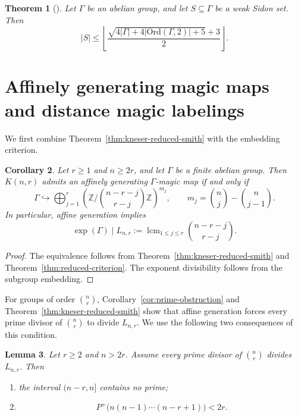 \documentclass[11pt,reqno]{amsart}
\theoremstyle{plain}
\newtheorem{theorem}{Theorem}[section]
\newtheorem{lemma}[theorem]{Lemma}
\newtheorem{corollary}[theorem]{Corollary}
\theoremstyle{definition}
\theoremstyle{remark}
\DeclareMathOperator{\ex}{exp}
\begin{document}
\begin{theorem}[\cite{HO07}]\label{thm:HO}
Let $\Gamma$ be an abelian group, and let $S\subseteq\Gamma$ be a
weak Sidon set. Then
\[
  |S|\le
  \left\lfloor
    \frac{\sqrt{4|\Gamma|+4|\mathrm{Ord}(\Gamma,2)|+5}+3}{2}
  \right\rfloor.
\]
\end{theorem}

\section{Affinely generating magic maps and distance magic labelings}
\label{sec:mainproof}

We first combine Theorem~\ref{thm:kneser-reduced-smith} with the embedding
criterion.

\begin{corollary}\label{cor:kneser-affine}
Let $r\ge1$ and $n\ge2r$, and let $\Gamma$ be a finite abelian group. Then
$K(n,r)$ admits an affinely generating $\Gamma$-magic map if and only if
\[
  \Gamma\hookrightarrow
  \bigoplus_{j=1}^{r}
  \left(\mathbb Z/\binom{n-r-j}{r-j}\mathbb Z\right)^{m_j},
  \qquad
  m_j=\binom nj-\binom n{j-1}.
\]
In particular, affine generation implies
\[
  \ex(\Gamma)\mid
  L_{n,r}:=\operatorname{lcm}_{1\le j\le r}
  \binom{n-r-j}{r-j}.
\]
\end{corollary}

\begin{proof}
The equivalence follows from Theorem~\ref{thm:kneser-reduced-smith} and
Theorem~\ref{thm:reduced-criterion}. The exponent divisibility follows from
the subgroup embedding.
\end{proof}

For groups of order $\binom nr$, Corollary~\ref{cor:prime-obstruction} and
Theorem~\ref{thm:kneser-reduced-smith} show that affine generation forces
every prime divisor of $\binom nr$ to divide $L_{n,r}$. We use the following
two consequences of this condition.

\begin{lemma}\label{lem:primediv}
Let $r\ge2$ and $n>2r$. Assume every prime divisor of $\binom{n}{r}$ divides
$L_{n,r}$. Then
\begin{enumerate}[label=\emph{(\alph*)},nosep,leftmargin=2.2em]
\item the interval $(n-r,n]$ contains no prime;
\item
\[
 P^{+}\bigl(n(n-1)\cdots(n-r+1)\bigr)<2r.
\]
\end{enumerate}
\end{lemma}
\end{document}
